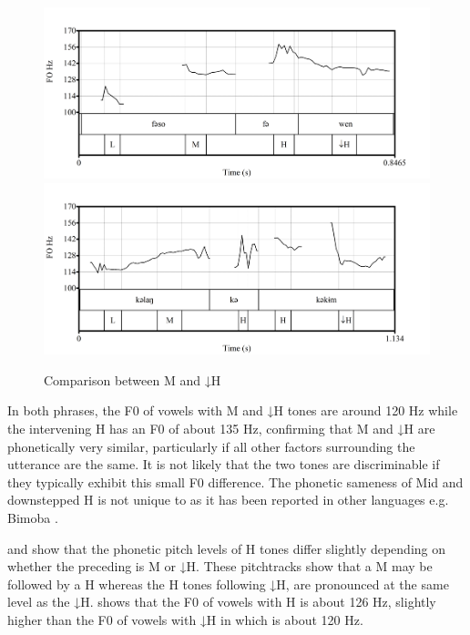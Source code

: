 \documentclass[output=paper,modfonts,nonflat,
colorlinks, citecolor=brown,
draftmode
]{langsci/langscibook}
\begin{document}
\begin{figure}[htbp]
	{\includegraphics[width=\textwidth]{figures/fig-akumbu-2a}}\\
	{\includegraphics[width=\textwidth]{figures/fig-akumbu-2b}}
\caption{Comparison between M and ↓H}\label{fig:akumbu:2}
\end{figure}

\newpage 
In both phrases, the F0 of vowels with M and ↓H tones are around 120 Hz while the intervening H  has an F0 of about 135 Hz, confirming that M and ↓H are phonetically very similar, particularly if all other factors surrounding the utterance are the same. It is not likely that the two tones are discriminable if they typically exhibit this small F0 difference. The phonetic sameness of Mid and downstepped H is not unique to  as it has been reported in other languages e.g. Bimoba \citep{Snider1998}. 
	
 and  show that the phonetic pitch levels of H tones differ slightly depending on whether the preceding  is M or ↓H. These pitchtracks show that a M  may be followed by a H  whereas the H tones following ↓H, are pronounced at the same level as the ↓H.  shows that the F0 of vowels with H  is about 126 Hz, slightly higher than the F0 of vowels with ↓H in  which is about 120 Hz. 
\end{document}
